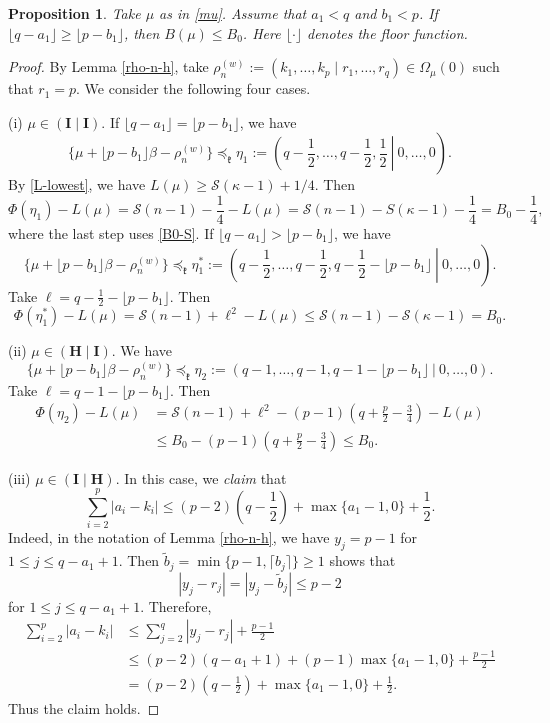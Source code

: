 \documentclass[11pt]{amsart}
\theoremstyle{plain}
\newtheorem{prop}[thm]{Proposition}
\theoremstyle{definition}
\newcommand{\mfk}{\mathfrak{k}}
\newcommand{\caS}{\mathcal{S}}
\begin{document}
\begin{prop}\label{pro-1}
	Take $\mu$ as in \eqref{mu}. Assume that $a_1<q$ and $b_1<p$. If $\lfloor q-a_1\rfloor\ge \lfloor p-b_1\rfloor$, then $B(\mu)\le B_0$. Here $\lfloor \cdot\rfloor$ denotes the floor function.
\end{prop}
\begin{proof}
	By Lemma \ref{rho-n-h}, take $\rho_n^{(w)}:=(k_1,\dots,k_p\mid r_1,\dots,r_q)\in \Omega_{\mu}(0)$ such that $r_1=p$. We consider the following four cases.
	
	(i) $\mu\in (\textbf{I}\mid\textbf{I})$. If $\lfloor q-a_1\rfloor=\lfloor p-b_1\rfloor$, we have
	\[\{\mu+\lfloor p-b_1\rfloor\beta-\rho_n^{(w)}\}\preceq_\mfk \eta_1 :=\left.\left(q-\frac{1}{2},\dots,q-\frac{1}{2},\frac{1}{2}\ \right|\ 0,\dots,0\right).\]
	 By \eqref{L-lowest}, we have $L(\mu)\ge \caS(\kappa-1)+1/4$. Then
	\[\Phi(\eta_1)-L(\mu)=\caS(n-1)-\frac{1}{4}-L(\mu)=\caS(n-1)-S(\kappa-1)-\frac{1}{4}=B_0-\frac{1}{4},\]
	where the last step uses \eqref{B0-S}. If $\lfloor q-a_1\rfloor>\lfloor p-b_1\rfloor$, we have	
		\[\{\mu+\lfloor p-b_1\rfloor\beta-\rho_n^{(w)}\}\preceq_\mfk \eta_1^* :=\left.\left(q-\frac{1}{2},\dots,q-\frac{1}{2},q-\frac{1}{2}-\lfloor p-b_1\rfloor\ \right|\ 0,\dots,0\right).\]
	Take $\ell=q-\frac{1}{2}-\lfloor p-b_1\rfloor$. Then
	\[\Phi(\eta_1^*)-L(\mu)=\caS(n-1)+\ell^2-L(\mu)\le \caS(n-1)-\caS(\kappa-1)= B_0.\]
	
	(ii) $\mu\in (\textbf{H}\mid \textbf{I})$. We have
	\[\{\mu+\lfloor p-b_1\rfloor\beta-\rho_n^{(w)}\}\preceq_\mfk \eta_2 :=\left.\left(q-1,\dots,q-1,q-1-\lfloor p-b_1\rfloor\ \right|\ 0,\dots,0\right).\]
	Take $\ell=q-1-\lfloor p-b_1\rfloor$. Then
	\begin{align*}
		\Phi(\eta_2)-L(\mu)&=\caS(n-1)+\ell^2-(p-1)\left(q+\frac{p}{2}-\frac{3}{4}\right)-L(\mu)\\
		&\le B_0-(p-1)\left(q+\frac{p}{2}-\frac{3}{4}\right)\le B_0.
	\end{align*}
	
	(iii) $\mu\in (\textbf{I}\mid \textbf{H})$. In this case, we \emph{claim} that
	\[\sum_{i=2}^p|a_i-k_i|\le (p-2)\left(q-\frac{1}{2}\right)+\max\{a_1-1,0\}+\frac{1}{2}.\]
	Indeed, in the notation of Lemma \ref{rho-n-h}, we have $y_j=p-1$ for $1\le j\le q-a_1+1$. Then $\widetilde{b}_j=\min\{p-1,\lceil b_j\rceil\}\ge 1$ shows that
	\[|y_j-r_j|=|y_j-\widetilde{b}_j|\le p-2\]
	for $1\le j\le q-a_1+1$. Therefore,
	\begin{align*}
		\sum_{i=2}^p|a_i-k_i|&\le \sum_{j=2}^q|y_j-r_j|+\frac{p-1}{2}\\
		&\le (p-2)(q-a_1+1)+(p-1)\max\{a_1-1,0\}+\frac{p-1}{2}\\
		&=\left(p-2\right)\left(q-\frac{1}{2}\right)+\max\{a_1-1,0\}+\frac{1}{2}.
	\end{align*}
	Thus the claim holds.
	

\end{proof}
\end{document}
